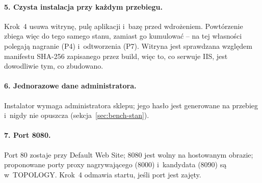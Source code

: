 \paragraph{5. Czysta instalacja przy każdym przebiegu.} Krok~4 usuwa witrynę, pulę
aplikacji i~bazę przed wdrożeniem. Powtórzenie zbiega więc do tego samego stanu, zamiast
go kumulować -- na tej własności polegają nagranie (P4) i~odtworzenia (P7). Witryna jest
sprawdzana względem manifestu SHA-256 zapisanego przez build, więc to, co serwuje IIS,
jest dowodliwie tym, co zbudowano.

\paragraph{6. Jednorazowe dane administratora.} Instalator wymaga administratora sklepu;
jego hasło jest generowane na przebieg i~nigdy nie opuszcza
 (sekcja~\ref{sec:bench-stan}).

\paragraph{7. Port 8080.} Port 80 zostaje przy Default Web Site; 8080 jest wolny na
hostowanym obrazie; proponowane porty proxy nagrywającego (8000) i~kandydata (8090) są
w~TOPOLOGY. Krok~4 odmawia startu, jeśli port jest zajęty.


